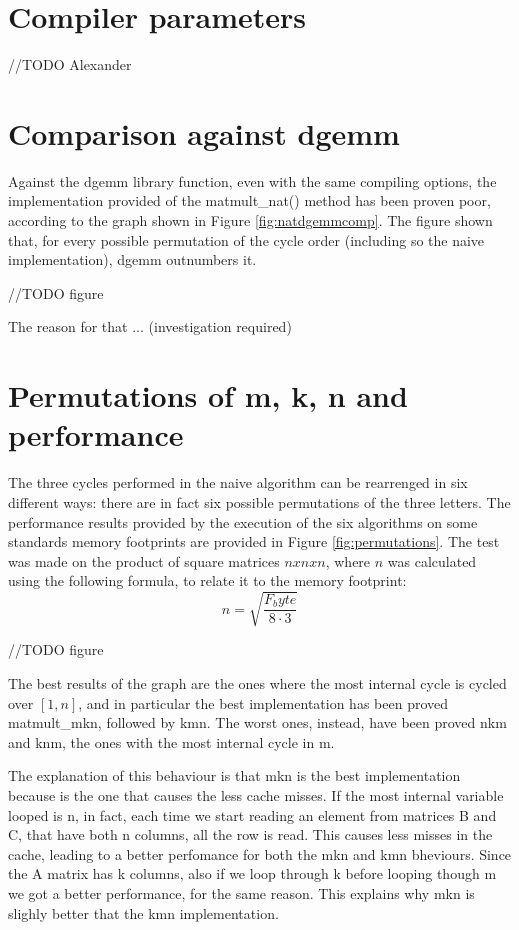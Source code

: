 \section{Compiler parameters}

//TODO Alexander
 
\section{Comparison against dgemm}

Against the dgemm library function, even with the same compiling options, the implementation provided of the matmult\_nat() method has been proven poor, according to the graph shown in Figure \ref{fig:natdgemmcomp}. The figure shown that, for every possible permutation of the cycle order (including so the naive implementation), dgemm outnumbers it.

//TODO figure

The reason for that ... (investigation required)

\section{Permutations of m, k, n and performance}
The three cycles performed in the naive algorithm can be rearrenged in six different ways: there are in fact six possible permutations of the three letters. The performance results provided by the execution of the six algorithms on some standards memory footprints are provided in Figure \ref{fig:permutations}. The test was made on the product of square matrices $nxnxn$, where $n$ was calculated using the following formula, to relate it to the memory footprint:
$$
n = \sqrt{\frac{F_byte}{8 \cdot 3} }
$$

//TODO figure

The best results of the graph are the ones where the most internal cycle is cycled over $[1,n]$, and in particular the best implementation has been proved matmult\_mkn, followed by kmn. The worst ones, instead, have been proved nkm and knm, the ones with the most internal cycle in m.

The explanation of this behaviour is that mkn is the best implementation because is the one that causes the less cache misses. If the most internal variable looped is n, in fact, each time we start reading an element from matrices B and C, that have both n columns, all the row is read. This causes less misses in the cache, leading to a better perfomance for both the mkn and kmn bheviours. Since the A matrix has k columns, also if we loop through k before looping though m we got a better performance, for the same reason. This explains why mkn is slighly better that  the kmn implementation.

